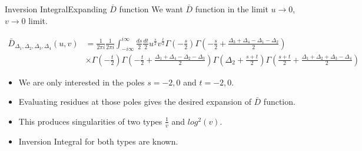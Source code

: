 \documentclass[pdf]{beamer}
\begin{document}
                \begin{frame}[t]{Inversion Integral}{Expanding $\bar{D}$ function}
                    We want $\bar{D}$ function in the limit $u\to0$, $v\to0$ limit\footnotemark[1].\par
                    \footnotesize
                    \begin{align*}
                        \bar{D}_{\Delta_1,\Delta_2,\Delta_3,\Delta_4}(u,v) &= \frac{1}{2\pi i}\frac{1}{2\pi i}\int_{-i\infty}^{i\infty} \frac{ds}{2}\frac{dt}{2}u^{\tfrac{s}{2}}v^{\tfrac{t}{2}}\Gamma(-\tfrac{s}{2})\Gamma(-\tfrac{s}{2}+\tfrac{\Delta_3+\Delta_4-\Delta_1-\Delta_2}{2})\\ & \times \Gamma(-\tfrac{t}{2})\Gamma(-\tfrac{t}{2}+\tfrac{\Delta_1+\Delta_4-\Delta_2-\Delta_3}{2})\Gamma(\Delta_2+\tfrac{s+t}{2})\Gamma(\tfrac{s+t}{2}+\tfrac{\Delta_1+\Delta_2+\Delta_3-\Delta_4}{2})
                    \end{align*}
                    \par
                    \normalsize
                    \begin{itemize}
                        \item<4-> We are only interested in the poles $s=-2,0$ and $t=-2,0$.\par
                        \item<5-> Evaluating residues at those poles gives the desired expansion of $\bar{D}$ function.\par
                        \item<6-> This produces singularities of two types $\frac{1}{v}$ and $log^2(v)$.\par
                        \item<7-> Inversion Integral for both types are known\footnotemark[2].
                    \end{itemize}
                \end{frame}
\end{document}
